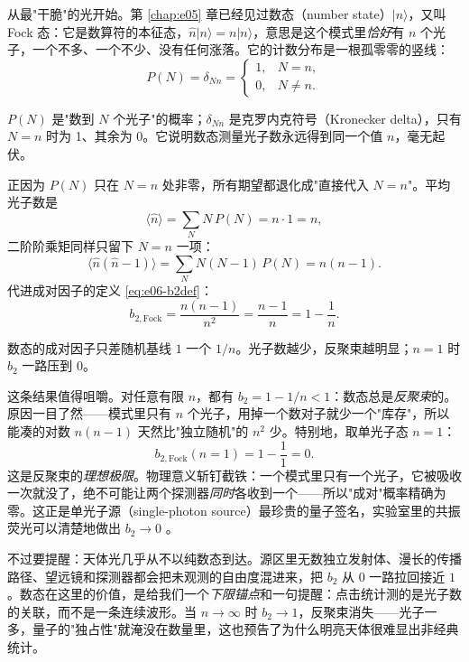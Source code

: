 从最"干脆"的光开始。第 \ref{chap:e05} 章已经见过数态（number state）\(|n\rangle\)，又叫 Fock 态：它是数算符的本征态，\(\hat n|n\rangle=n|n\rangle\)，意思是这个模式里\emph{恰好}有 \(n\) 个光子，一个不多、一个不少、没有任何涨落。它的计数分布是一根孤零零的竖线：
\begin{equation}
  P(N)=\delta_{Nn}=
  \begin{cases}
    1, & N=n,\\
    0, & N\neq n.
  \end{cases}
  \label{eq:e06-fock-dist}
\end{equation}
\begin{formulaexplain}
\(P(N)\) 是"数到 \(N\) 个光子"的概率；\(\delta_{Nn}\) 是克罗内克符号（Kronecker delta），只有 \(N=n\) 时为 1、其余为 0。它说明数态测量光子数永远得到同一个值 \(n\)，毫无起伏。
\end{formulaexplain}

正因为 \(P(N)\) 只在 \(N=n\) 处非零，所有期望都退化成"直接代入 \(N=n\)"。平均光子数是
\[
  \langle\hat n\rangle=\sum_{N}N\,P(N)=n\cdot 1=n,
\]
二阶阶乘矩同样只留下 \(N=n\) 一项：
\[
  \langle\hat n(\hat n-1)\rangle=\sum_{N}N(N-1)\,P(N)=n(n-1).
\]
代进成对因子的定义 \eqref{eq:e06-b2def}：
\begin{equation}
  b_{2,\text{Fock}}=\frac{n(n-1)}{n^{2}}=\frac{n-1}{n}=1-\frac{1}{n}.
  \label{eq:e06-fock-b2}
\end{equation}
\begin{formulaexplain}
数态的成对因子只差随机基线 \(1\) 一个 \(1/n\)。光子数越少，反聚束越明显；\(n=1\) 时 \(b_2\) 一路压到 \(0\)。
\end{formulaexplain}

这条结果值得咀嚼。对任意有限 \(n\)，都有 \(b_2=1-1/n<1\)：数态总是\emph{反聚束}的。原因一目了然——模式里只有 \(n\) 个光子，用掉一个数对子就少一个"库存"，所以能凑的对数 \(n(n-1)\) 天然比"独立随机"的 \(n^2\) 少。特别地，取单光子态 \(n=1\)：
\[
  b_{2,\text{Fock}}(n=1)=1-\frac{1}{1}=0.
\]
这是反聚束的\emph{理想极限}。物理意义斩钉截铁：一个模式里只有一个光子，它被吸收一次就没了，绝不可能让两个探测器\emph{同时}各收到一个——所以"成对"概率精确为零。这正是单光子源（single-photon source）最珍贵的量子签名，实验室里的共振荧光可以清楚地做出 \(b_2\to 0\) \citep{1977PhRvL..39..691K}。

不过要提醒：天体光几乎从不以纯数态到达。源区里无数独立发射体、漫长的传播路径、望远镜和探测器都会把未观测的自由度混进来，把 \(b_2\) 从 \(0\) 一路拉回接近 \(1\)。数态在这里的价值，是给我们一个\emph{下限锚点}和一句提醒：点击统计测的是光子数的关联，而不是一条连续波形。当 \(n\to\infty\) 时 \(b_2\to 1\)，反聚束消失——光子一多，量子的"独占性"就淹没在数量里，这也预告了为什么明亮天体很难显出非经典统计。

